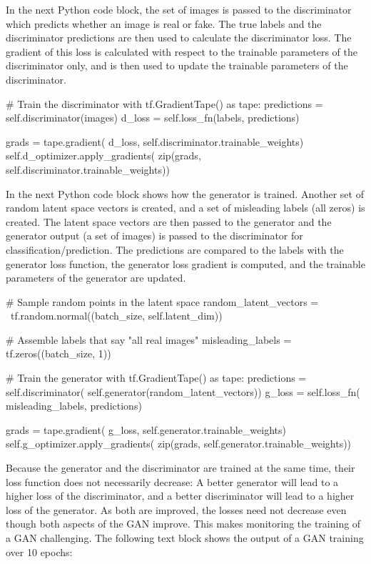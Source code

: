 In the next Python code block, the set of images is passed to the discriminator which predicts whether an image is real or fake. The true labels and the discriminator predictions are then used to calculate the discriminator loss. The gradient of this loss is calculated with respect to the trainable parameters of the discriminator only, and is then used to update the trainable parameters of the discriminator.

\begin{pythoncode}
        # Train the discriminator
        with tf.GradientTape() as tape:
            predictions = self.discriminator(images)
            d_loss = self.loss_fn(labels, predictions)
            
        grads = tape.gradient(
            d_loss, 
            self.discriminator.trainable_weights)
        self.d_optimizer.apply_gradients(
            zip(grads, self.discriminator.trainable_weights))
\end{pythoncode}

In the next Python code block shows how the generator is trained. Another set of random latent space vectors is created, and a set of misleading labels (all zeros) is created. The latent space vectors are then passed to the generator and the generator output (a set of images) is passed to the discriminator for classification/prediction. The predictions are compared to the labels with the generator loss function, the generator loss gradient is computed, and the trainable parameters of the generator are updated.

\begin{pythoncode}
        # Sample random points in the latent space
        random_latent_vectors = \
            tf.random.normal((batch_size, self.latent_dim))

        # Assemble labels that say "all real images"
        misleading_labels = tf.zeros((batch_size, 1))

        # Train the generator 
        with tf.GradientTape() as tape:
            predictions = self.discriminator(
                self.generator(random_latent_vectors))
            g_loss = self.loss_fn(
                misleading_labels, predictions)

        grads = tape.gradient(
            g_loss, 
            self.generator.trainable_weights)
        self.g_optimizer.apply_gradients(
            zip(grads, self.generator.trainable_weights))
\end{pythoncode}

Because the generator and the discriminator are trained at the same time, their loss function does not necessarily decrease: A better generator will lead to a higher loss of the discriminator, and a better discriminator will lead to a higher loss of the generator. As both are improved, the losses need not decrease even though both aspects of the GAN improve. This makes monitoring the training of a GAN challenging. The following text block shows the output of a GAN training over 10 epochs:

